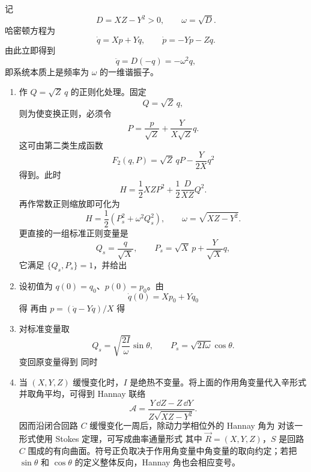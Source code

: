 \begin{question}[一维广义谐振子]
\begin{solution}
记
\[
  D=XZ-Y^2>0,
  \qquad
  \omega=\sqrt D.
\]
哈密顿方程为
\[
  \dot q=Xp+Yq,
  \qquad
  \dot p=-Yp-Zq.
\]
由此立即得到
\[
  \ddot q=D(-q)=-\omega^2q,
\]
即系统本质上是频率为 $\omega$ 的一维谐振子。
\begin{enumerate}
  \item 作 $Q=\sqrt Z\,q$ 的正则化处理。固定
  \[
    Q=\sqrt Z\,q,
  \]
  则为使变换正则，必须令
  \[
    P=\frac{p}{\sqrt Z}+\frac{Y}{X\sqrt Z}q.
  \]
  这可由第二类生成函数
  \[
    F_2(q,P)=\sqrt Z\,qP-\frac{Y}{2X}q^2
  \]
  得到。此时
  \[
    H=\frac12XZP^2+\frac12\frac{D}{XZ}Q^2.
  \]
  再作常数正则缩放即可化为
  \[
    H=\frac12(P_s^2+\omega^2Q_s^2),
    \qquad \omega=\sqrt{XZ-Y^2}.
  \]
  更直接的一组标准正则变量是
  \[
    Q_s=\frac{q}{\sqrt X},
    \qquad
    P_s=\sqrt X\,p+\frac{Y}{\sqrt X}q,
  \]
  它满足 $\{Q_s,P_s\}=1$，并给出
  \item 设初值为 $q(0)=q_0$、$p(0)=p_0$。由
  \[
    \dot q(0)=Xp_0+Yq_0
  \]
  得
  再由 $p=(\dot q-Yq)/X$ 得
  \item 对标准变量取
  \[
    Q_s=\sqrt{\frac{2I}{\omega}}\sin\theta,
    \qquad
    P_s=\sqrt{2I\omega}\cos\theta .
  \]
  变回原变量得到
  同时
  \item 当 $(X,Y,Z)$ 缓慢变化时，$I$ 是绝热不变量。将上面的作用角变量代入辛形式并取角平均，可得到 Hannay 联络
  \[
    \mathcal A=\frac{Y\,\dd Z-Z\,\dd Y}{Z\sqrt{XZ-Y^2}}.
  \]
  因而沿闭合回路 $C$ 缓慢变化一周后，除动力学相位外的 Hannay 角为
  对该一形式使用 Stokes 定理，可写成曲率通量形式
  其中 $\vec R=(X,Y,Z)$，$S$ 是回路 $C$ 围成的有向曲面。符号正负取决于作用角变量中角变量的取向约定；若把 $\sin\theta$ 和 $\cos\theta$ 的定义整体反向，Hannay 角也会相应变号。
\end{enumerate}
\end{solution}

\end{question}
